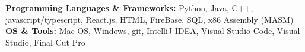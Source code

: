 

\begin{cvparagraph}

\textbf{Programming Languages \& Frameworks:}  Python, Java, C++, javascript/typescript, React.js, HTML, FireBase, SQL, x86 Assembly (MASM)
\\[2pt]
\textbf{OS \& Tools:} Mac OS, Windows, git, IntelliJ IDEA, Visual Studio Code, Visual Studio, Final Cut Pro


\end{cvparagraph}
